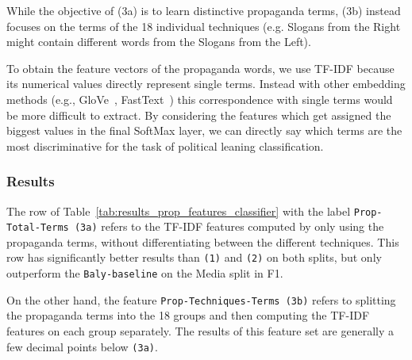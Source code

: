 While the objective of (3a) is to learn distinctive propaganda terms, (3b) instead focuses on the terms of the 18 individual techniques (e.g. Slogans from the Right might contain different words from the Slogans from the Left).

To obtain the feature vectors of the propaganda words, we use TF-IDF 
because its numerical values directly represent single terms. Instead with other embedding methods (e.g., GloVe~\citep{pennington2014glove}, FastText~\citep{joulin2016fasttext}) this correspondence with single terms would be more difficult to extract. By considering the features which get assigned the biggest values in the final SoftMax layer, we can directly say which terms are the most discriminative for the task of political leaning classification.

\subsubsection{Results}

The row of Table~\ref{tab:results_prop_features_classifier} with the label \texttt{Prop-Total-Terms (3a)} refers to the TF-IDF features computed by only using the propaganda terms, without differentiating between the different techniques.
This row has significantly better results than \texttt{(1)} and \texttt{(2)} on both splits, but only outperform the \texttt{Baly-baseline}  on the Media split in F1. %

On the other hand, the feature \texttt{Prop-Techniques-Terms (3b)} refers to splitting the propaganda terms into the 18 groups and then computing the TF-IDF features on each group separately. The results of this feature set are generally a few decimal points below \texttt{(3a)}.



